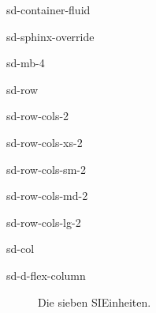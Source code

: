 \documentclass[letterpaper,10pt,english]{jupyterBook}
\let\sphinxpxdimen\pdfpxdimen\else\newdimen\sphinxpxdimen
\begin{document}
\begin{sphinxuseclass}{sd-container-fluid}
\begin{sphinxuseclass}{sd-sphinx-override}
\begin{sphinxuseclass}{sd-mb-4}
\begin{sphinxuseclass}{sd-row}
\begin{sphinxuseclass}{sd-row-cols-2}
\begin{sphinxuseclass}{sd-row-cols-xs-2}
\begin{sphinxuseclass}{sd-row-cols-sm-2}
\begin{sphinxuseclass}{sd-row-cols-md-2}
\begin{sphinxuseclass}{sd-row-cols-lg-2}
\begin{sphinxuseclass}{sd-col}
\begin{sphinxuseclass}{sd-d-flex-column}
\begin{figure}[htbp]
\noindent\sphinxincludegraphics[width=300\sphinxpxdimen]{{SI}.jpg}
\caption{Die sieben SI\sphinxhyphen{}Einheiten.}\label{\detokenize{content/1_Messen_Einheit:si}}\end{figure}

\end{sphinxuseclass}
\end{sphinxuseclass}
\end{sphinxuseclass}
\end{sphinxuseclass}
\end{sphinxuseclass}
\end{sphinxuseclass}
\end{sphinxuseclass}
\end{sphinxuseclass}
\end{sphinxuseclass}
\end{sphinxuseclass}
\end{sphinxuseclass}
\end{document}
